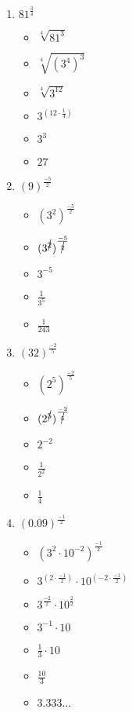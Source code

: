 \documentclass{article}
\begin{document}
\begin{onehalfspace}
\begin{enumerate}[start=15]
        \item $81^{\frac{3}{4}}$
        \begin{itemize}
            \item $\sqrt[4]{81^{3}}$
            \item $\sqrt[4]{(3^{4})^{3}}$
            \item $\sqrt[4]{3^{12}}$
            \item $3^{(12 \cdot \frac{1}{4})}$
            \item $3^{3}$
            \item $27$
        \end{itemize}

        \item $(9)^{\frac{-5}{2}}$
        \begin{itemize}
            \item $(3^{2})^{\frac{-5}{2}}$
            \item $(3^{\cancel{2}})^{\frac{-5}{\cancel{2}}}$
            \item $3^{-5}$
            \item $\frac{1}{3^{5}}$
            \item $\frac{1}{243}$
        \end{itemize}

        \item $(32)^{\frac{-2}{5}}$
        \begin{itemize}
            \item $(2^{5})^{\frac{-2}{5}}$
            \item $(2^{\cancel{5}})^{\frac{-2}{\cancel{5}}}$
            \item $2^{-2}$
            \item $\frac{1}{2^{2}}$
            \item $\frac{1}{4}$
        \end{itemize}

        \item $(0.09)^{\frac{-1}{2}}$
        \begin{itemize}
            \item $(3^{2} \cdot 10^{-2})^{\frac{-1}{2}}$
            \item $3^{(2 \cdot \frac{-1}{2})} \cdot 10^{(-2 \cdot \frac{-1}{2})}$
            \item $3^{\frac{-2}{2}} \cdot 10^{\frac{2}{2}}$
            \item $3^{-1} \cdot 10$
            \item $\frac{1}{3} \cdot 10$
            \item $\frac{10}{3}$
            \item $3.333\dots$
        \end{itemize}


\end{enumerate}
\end{onehalfspace}
\end{document}
